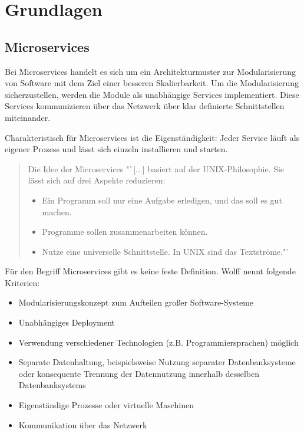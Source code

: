 \section{Grundlagen}
\label{chapter:grundlagen}

\subsection{Microservices} 
\label{chapter:microservices}
Bei Microservices handelt es sich um ein Architekturmuster zur Modularisierung von Software mit dem Ziel einer besseren Skalierbarkeit. Um die Modularisierung sicherzustellen, werden die Module als unabhängige Services implementiert. Diese Services kommunizieren über das Netzwerk über klar definierte Schnittstellen miteinander.

Charakteristisch für Microservices ist die Eigenständigkeit: Jeder Service läuft als eigener Prozess und lässt sich einzeln installieren und starten.
\begin{quote}
 Die Idee der Microservices "`[...] basiert auf der UNIX-Philosophie. Sie lässt sich auf drei Aspekte reduzieren:
\begin{itemize}
 \item Ein Programm soll nur eine Aufgabe erledigen, und das soll es gut machen.
 \item Programme sollen zusammenarbeiten können.
 \item Nutze eine universelle Schnittstelle. In UNIX sind das Textströme."'
\end{itemize}
\cite[2]{wolff_microservices:_2015}
\end{quote}

Für den Begriff Microservices gibt es keine feste Definition. Wolff nennt folgende Kriterien: 
\begin{itemize}
 \item Modularisierungskonzept zum Aufteilen großer Software-Systeme
 \item Unabhängiges Deployment
 \item Verwendung verschiedener Technologien (z.B. Programmiersprachen) möglich
 \item Separate Datenhaltung, beispielsweise Nutzung separater Datenbanksysteme oder konsequente Trennung der Datennutzung innerhalb desselben Datenbanksystems
 \item Eigenständige Prozesse oder virtuelle Maschinen
 \item Kommunikation über das Netzwerk
\end{itemize}
\cite[2]{wolff_microservices:_2015}

